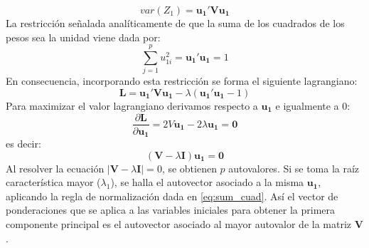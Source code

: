 \begin{enumerate}
\begin{enumerate}
        \begin{equation}
            var(Z_1)=\mathbf{u_1'Vu_1}
            \label{eq:var_matriz}
        \end{equation}
        La restricción señalada analíticamente de que la suma de los cuadrados de los pesos sea la unidad viene dada por:
        \begin{equation}
            \sum\limits_{j = 1}^{p}{u}_{1i}^{2}=\mathbf{u_1'u_1}=1
            \label{eq:sum_cuad}
        \end{equation}
        En consecuencia, incorporando esta restricción se forma el siguiente lagrangiano:
        \begin{equation}
            \mathbf{L}=\mathbf{u_1'Vu_1}-\lambda(\mathbf{u_1'u_1}-1)
        \end{equation}
        Para maximizar el valor lagrangiano derivamos respecto a $\mathbf{u_1}$ e igualmente a 0:
        \begin{equation}
            \frac{\partial \mathbf{L}}{\partial \mathbf{u_1}}=2V\mathbf{u_1}-2\lambda \mathbf{u_1}=\mathbf{0}
        \end{equation}
        es decir:
        \begin{equation}
            (\mathbf{V}-\lambda \mathbf{I})\mathbf{u_1}=\mathbf{0}
        \end{equation}
        Al resolver la ecuación $|\mathbf{V}-\lambda \mathbf{I}|=0$, se obtienen $p$ autovalores. Si se toma la raíz característica mayor ($\lambda_1$), se halla el autovector asociado a la misma $\mathbf{u_1}$, aplicando la regla de normalización dada en \eqref{eq:sum_cuad}. Así el vector de ponderaciones que se aplica a las variables iniciales para obtener la primera componente principal es el autovector asociado al mayor autovalor de la matriz $\mathbf{V}$.


\end{enumerate}
\end{enumerate}
